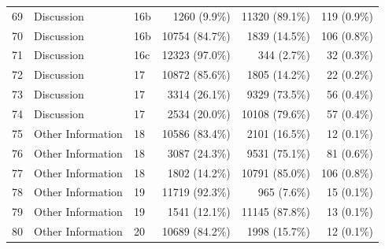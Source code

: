 \begin{longtable}{@{}rllrrr@{}}
69 & Discussion & 16b & 1260 (9.9\%) & 11320 (89.1\%) & 119 (0.9\%) \\
70 & Discussion & 16b & 10754 (84.7\%) & 1839 (14.5\%) & 106 (0.8\%) \\
71 & Discussion & 16c & 12323 (97.0\%) & 344 (2.7\%) & 32 (0.3\%) \\
72 & Discussion & 17 & 10872 (85.6\%) & 1805 (14.2\%) & 22 (0.2\%) \\
73 & Discussion & 17 & 3314 (26.1\%) & 9329 (73.5\%) & 56 (0.4\%) \\
74 & Discussion & 17 & 2534 (20.0\%) & 10108 (79.6\%) & 57 (0.4\%) \\
75 & Other Information & 18 & 10586 (83.4\%) & 2101 (16.5\%) & 12 (0.1\%) \\
76 & Other Information & 18 & 3087 (24.3\%) & 9531 (75.1\%) & 81 (0.6\%) \\
77 & Other Information & 18 & 1802 (14.2\%) & 10791 (85.0\%) & 106 (0.8\%) \\
78 & Other Information & 19 & 11719 (92.3\%) & 965 (7.6\%) & 15 (0.1\%) \\
79 & Other Information & 19 & 1541 (12.1\%) & 11145 (87.8\%) & 13 (0.1\%) \\
80 & Other Information & 20 & 10689 (84.2\%) & 1998 (15.7\%) & 12 (0.1\%) \\

\end{longtable}


